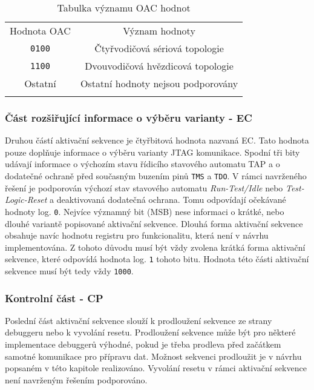 \begin{table}[!h]
  \caption{Tabulka významu OAC hodnot \cite{IEEE_1149-7}}
  \begin{center}
  	\small
	  \begin{tabular}{!{\vrule width 1.2pt}c|c!{\vrule width 1.2pt}}
	    Hodnota \acs{OAC} & Význam hodnoty\\
			\texttt{0100} & Čtyřvodičová sériová topologie\\
			\hline
			\texttt{1100} & Dvouvodičová hvězdicová topologie\\
			\hline
			Ostatní & Ostatní hodnoty nejsou podporovány\\
			\hline
		\end{tabular}
  \end{center}
	\label{tab:oac}
\end{table}

\subsubsection{Část rozšiřující informace o výběru varianty - \acs{EC}}
Druhou částí aktivační sekvence je čtyřbitová hodnota nazvaná \acl{EC}. Tato hodnota pouze doplňuje informace o výběru varianty \acs{JTAG} komunikace. Spodní tři bity udávají informace o výchozím stavu řídicího stavového automatu \acs{TAP} a o dodatečné ochraně před současným buzením pinů \texttt{\acs{TMS}} a \texttt{\acs{TDO}}. V rámci navrženého řešení je podporován výchozí stav stavového automatu \textit{Run-Test/Idle} nebo \textit{Test-Logic-Reset} a deaktivovaná dodatečná ochrana. Tomu odpovídají očekávané hodnoty log. \texttt{0}. Nejvíce významný bit (\acs{MSB}) nese informaci o krátké, nebo dlouhé variantě popisované aktivační sekvence. Dlouhá forma aktivační sekvence obsahuje navíc hodnotu registru pro funkcionalitu, která není v návrhu implementována. Z tohoto důvodu musí být vždy zvolena krátká forma aktivační sekvence, které odpovídá hodnota log. \texttt{1} tohoto bitu. Hodnota této části aktivační sekvence musí být tedy vždy \texttt{1000}. \cite{IEEE_1149-7}

\subsubsection{Kontrolní část - \acs{CP}}
Poslední část aktivační sekvence slouží k prodloužení sekvence ze strany debuggeru nebo k vyvolání resetu. Prodloužení sekvence může být pro některé implementace debuggerů výhodné, pokud je třeba prodleva před začátkem samotné komunikace pro přípravu dat. Možnost sekvenci prodloužit je v návrhu popsaném v této kapitole realizováno. Vyvolání resetu v rámci aktivační sekvence není navrženým řešením podporováno. \cite{IEEE_1149-7}

